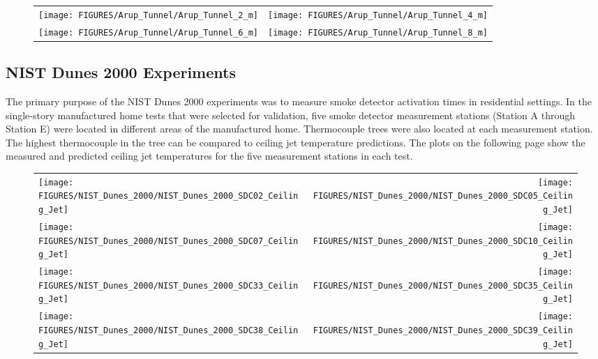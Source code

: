 \begin{figure}[h!]
\begin{tabular*}{\textwidth}{l@{\extracolsep{\fill}}r}
\texttt{[image: FIGURES/Arup\_Tunnel/Arup\_Tunnel\_2\_m]} &
\texttt{[image: FIGURES/Arup\_Tunnel/Arup\_Tunnel\_4\_m]} \\
\texttt{[image: FIGURES/Arup\_Tunnel/Arup\_Tunnel\_6\_m]} &
\texttt{[image: FIGURES/Arup\_Tunnel/Arup\_Tunnel\_8\_m]}
\end{tabular*}
\label{Arup_Tunnel}
\end{figure}

\clearpage

\subsection{NIST Dunes 2000 Experiments}

The primary purpose of the NIST Dunes 2000 experiments was to measure smoke detector activation times in residential settings. In the single-story manufactured home tests that were selected for validation, five smoke detector measurement stations (Station A through Station E) were located in different areas of the manufactured home. Thermocouple trees were also located at each measurement station. The highest thermocouple in the tree can be compared to ceiling jet temperature predictions. The plots on the following page show the measured and predicted ceiling jet temperatures for the five measurement stations in each test.

\begin{figure}[h!]
\begin{tabular*}{\textwidth}{l@{\extracolsep{\fill}}r}
\texttt{[image: FIGURES/NIST\_Dunes\_2000/NIST\_Dunes\_2000\_SDC02\_Ceiling\_Jet]} &
\texttt{[image: FIGURES/NIST\_Dunes\_2000/NIST\_Dunes\_2000\_SDC05\_Ceiling\_Jet]} \\
\texttt{[image: FIGURES/NIST\_Dunes\_2000/NIST\_Dunes\_2000\_SDC07\_Ceiling\_Jet]} &
\texttt{[image: FIGURES/NIST\_Dunes\_2000/NIST\_Dunes\_2000\_SDC10\_Ceiling\_Jet]} \\
\texttt{[image: FIGURES/NIST\_Dunes\_2000/NIST\_Dunes\_2000\_SDC33\_Ceiling\_Jet]} &
\texttt{[image: FIGURES/NIST\_Dunes\_2000/NIST\_Dunes\_2000\_SDC35\_Ceiling\_Jet]} \\
\texttt{[image: FIGURES/NIST\_Dunes\_2000/NIST\_Dunes\_2000\_SDC38\_Ceiling\_Jet]} &
\texttt{[image: FIGURES/NIST\_Dunes\_2000/NIST\_Dunes\_2000\_SDC39\_Ceiling\_Jet]}
\end{tabular*}
\label{NIST_Dunes_2000_Ceiling_Jet}
\end{figure}


